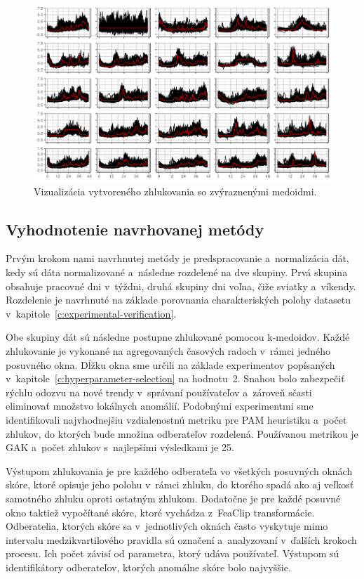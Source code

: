 \documentclass[a4paper,twoside,slovak,12pt,appendix]{article}
\begin{document}
\begin{figure}[htbp]
  \centering
  \includegraphics[width=\textwidth]{clustering_workdays.png}
  \caption{Vizualizácia vytvoreného zhlukovania so zvýraznenými medoidmi.}
	\label{fig:clustering-workdays}
\end{figure}

\subsection{Vyhodnotenie navrhovanej metódy}
Prvým krokom nami navrhnutej metódy je predspracovanie a~normalizácia dát, kedy
sú dáta normalizované a~následne rozdelené na dve skupiny. Prvá skupina obsahuje
pracovné dni v~týždni, druhá skupiny dni voľna, čiže sviatky a~víkendy.
Rozdelenie je navrhnuté na základe porovnania charakteriských polohy datasetu
v~kapitole~\ref{c:experimental-verification}.

Obe skupiny dát sú následne postupne zhlukované pomocou k-medoidov. Každé
zhlukovanie je vykonané na agregovaných časových radoch v~rámci jedného
posuvného okna. Dĺžku okna sme určili na základe experimentov popísaných
v~kapitole~\ref{c:hyperparameter-selection} na hodnotu~2. Snahou bolo zabezpečiť
rýchlu odozvu na nové trendy v~správaní používateľov a~zároveň sčasti eliminovať
množstvo lokálnych anomálií. Podobnými experimentmi sme identifikovali
najvhodnejšiu vzdialenostnú metriku pre PAM heuristiku a~počet zhlukov, do
ktorých bude množina odberateľov rozdelená. Používanou metrikou je GAK a~počet
zhlukov s~najlepšími výsledkami je 25.

Výstupom zhlukovania je pre každého odberateľa vo všetkých posuvných oknách
skóre, ktoré opisuje jeho polohu v~rámci zhluku, do ktorého spadá ako aj veľkosť
samotného zhluku oproti ostatným zhlukom. Dodatočne je pre každé posuvné okno
taktiež vypočítané skóre, ktoré vychádza z~FeaClip transformácie. Odberatelia,
ktorých skóre sa v~jednotlivých oknách často vyskytuje mimo intervalu
medzikvartilového pravidla sú označení a~analyzovaní v~ďalších krokoch procesu.
Ich počet závisí od parametra, ktorý udáva používateľ. Výstupom sú
identifikátory odberateľov, ktorých anomálne skóre bolo najvyššie.
\end{document}
